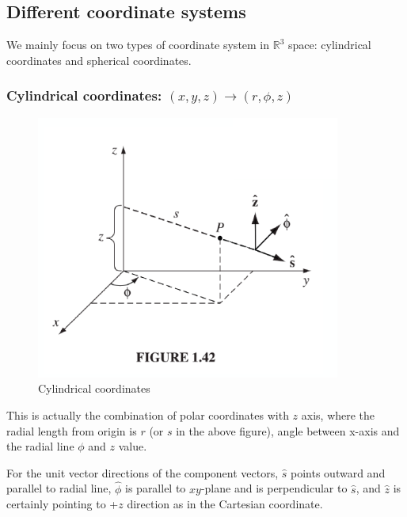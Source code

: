 \documentclass[12pt,a4paper,twoside]{article}
\begin{document}
	
	\subsection{Different coordinate systems}
	We mainly focus on two types of coordinate system in \(\mathbb{R}^3\) space: cylindrical coordinates and spherical coordinates.
	\subsubsection{Cylindrical coordinates: \((x,y,z)\rightarrow(r,\phi,z)\)}
	\begin{figure}[ht]
		\centering
		\includegraphics[width = 10cm]{250-Revision/cylindrical.png}
		\caption{Cylindrical coordinates}
		\label{fig:cylindrical}
	\end{figure}
	This is actually the combination of polar coordinates with $z$ axis, where the radial length from origin is $r$ (or $s$ in the above figure), angle between x-axis and the radial line \(\phi\) and $z$ value.
	
	For the unit vector directions of the component vectors, $\hat{s}$ points outward and parallel to radial line, $\hat{\phi}$ is parallel to $xy$-plane and is perpendicular to $\hat{s}$, and $\hat{z}$ is certainly pointing to +$z$ direction as in the Cartesian coordinate.\\
	
\end{document}
